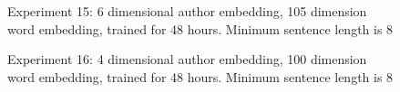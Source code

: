 \documentclass{article}%
\begin{document}
\begin{figure}
\noindent{}
\caption{Experiment 15: 6 dimensional author embedding, 105 dimension word embedding, trained for 48 hours. Minimum sentence length is 8}
\end{figure}
\begin{figure}
\noindent{}
\caption{Experiment 16: 4 dimensional author embedding, 100 dimension word embedding, trained for 48 hours. Minimum sentence length is 8}
\end{figure}
\end{document}
